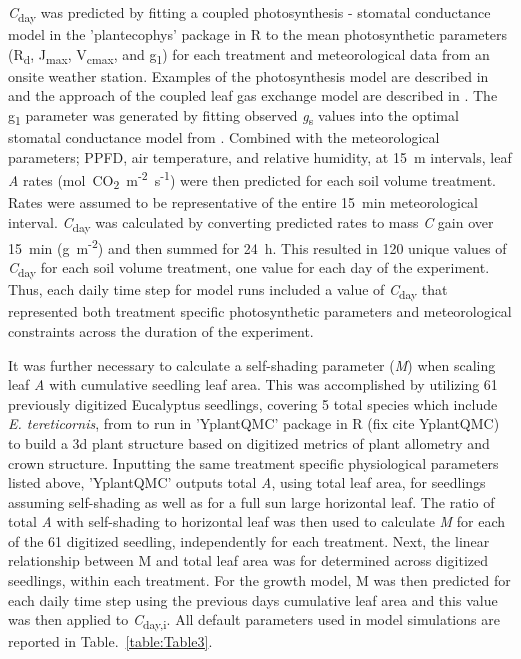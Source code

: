 \documentclass[a4paper]{article}\usepackage[]{graphicx}\usepackage[]{color}
\begin{document}
\textit{C}\textsubscript{day} was predicted by fitting a coupled photosynthesis - stomatal conductance model \citep{farquhar1980biochemical,medlyn2011reconciling} in the 'plantecophys' package in R \citep{Duursma2014} to the mean photosynthetic parameters (R\textsubscript{d}, J\textsubscript{max}, V\textsubscript{cmax}, and g\textsubscript{1}) for each treatment and meteorological data from an onsite weather station.  Examples of the photosynthesis model are described in \citet{medlyn2002temperature} and the approach of the coupled leaf gas exchange model are described in \citet{duursma2014peaked}. The g\textsubscript{1} parameter was generated by fitting observed \textit{g}\textsubscript{s} values into the optimal stomatal conductance model from \citep{medlyn2012reconciling}. Combined with the meteorological parameters; PPFD, air temperature, and relative humidity, at 15~m intervals, leaf \textit{A} rates ({\textmugreek}mol~CO\textsubscript{2}~m\textsuperscript{-2}~s\textsuperscript{-1}) were then predicted for each soil volume treatment. Rates were assumed to be representative of the entire 15~min meteorological interval. \textit{C}\textsubscript{day} was calculated by converting predicted rates to mass \textit{C} gain over 15~min (g~m\textsuperscript{-2}) and then summed for 24~h. This resulted in 120 unique values of \textit{C}\textsubscript{day} for each soil volume treatment, one value for each day of the experiment. Thus, each daily time step for model runs included a value of \textit{C}\textsubscript{day} that represented both treatment specific photosynthetic parameters and meteorological constraints across the duration of the experiment. 

It was further necessary to calculate a self-shading parameter (\textit{M}) when scaling leaf \textit{A} with cumulative seedling leaf area. This was accomplished by utilizing 61 previously digitized Eucalyptus seedlings, covering 5 total species which include \textit{E. tereticornis}, from \citet{duursma2012light} to run in 'YplantQMC' package in R (fix cite YplantQMC) to build a 3d plant structure based on digitized metrics of plant allometry and crown structure. Inputting the same treatment specific physiological parameters listed above, 'YplantQMC' outputs total \textit{A}, using total leaf area, for seedlings assuming self-shading as well as for a full sun large horizontal leaf.  The ratio of total \textit{A} with self-shading to horizontal leaf was then used to calculate \textit{M} for each of the 61 digitized seedling, independently for each treatment. Next, the linear relationship between M and total leaf area was for determined across digitized seedlings, within each treatment. For the growth model, M was then predicted for each daily time step using the previous days cumulative leaf area and this value  was then applied to \textit{C}\textsubscript{day,i}. All default parameters used in model simulations are reported in Table.~\ref{table:Table3}.
\end{document}
